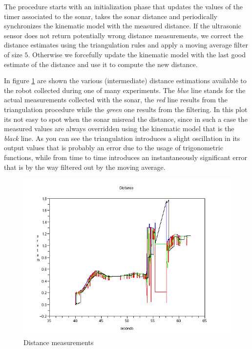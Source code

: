 The procedure starts with an initialization phase that updates the values of the timer associated to the sonar, takes the sonar distance and periodically synchronizes the kinematic model with the measured distance. If the ultrasonic sensor does not return potentially wrong distance measurements, we correct the distance estimates using the triangulation rules and apply a moving average filter of size $5$. Otherwise we forcefully update the kinematic model with the last good estimate of the distance and use it to compute the new distance.

In figure \ref{fig:sonar02} are shown the various (intermediate) distance estimations available to the robot collected during one of many experiments. The \textit{blue} line stands for the actual measurements collected with the sonar, the \textit{red} line results from the triangulation procedure while the \textit{green} one results from the filtering. In this plot its not easy to spot when the sonar misread the distance, since in such a case the measured values are always overridden using the kinematic model that is the \textit{black} line. As you can see the triangulation introduces a slight oscillation in its output values that is probably an error due to the usage of trigonometric functions, while from time to time introduces an instantaneously significant error that is by the way filtered out by the moving average.

\begin{figure}[H]
  \begin{center}
  \includegraphics[scale=0.51]{FIGURES_3/Sonar02.png}
    \caption[Trigonometry]{Distance measurements}
    \label{fig:sonar02}
  \end{center}
\end{figure}

